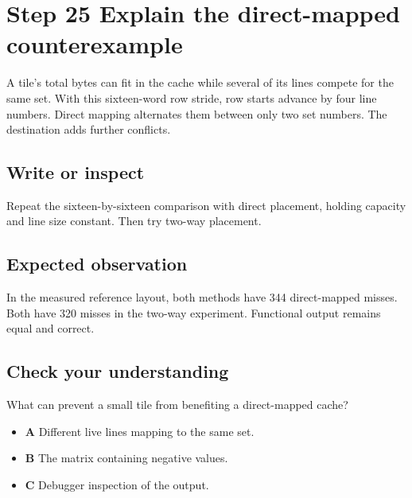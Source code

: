 \section{Step 25 Explain the direct-mapped counterexample}\label{transpose-s25}

A tile’s total bytes can fit in the cache while several of its lines compete for the same set. With this sixteen-word row stride, row starts advance by four line numbers. Direct mapping alternates them between only two set numbers. The destination adds further conflicts.

\subsection{Write or inspect}
Repeat the sixteen-by-sixteen comparison with direct placement, holding capacity and line size constant. Then try two-way placement.

\subsection{Expected observation}
In the measured reference layout, both methods have 344 direct-mapped misses. Both have 320 misses in the two-way experiment. Functional output remains equal and correct.

\subsection{Check your understanding}
What can prevent a small tile from benefiting a direct-mapped cache?

\begin{itemize}
  \item \textbf{A} Different live lines mapping to the same set.
  \item \textbf{B} The matrix containing negative values.
  \item \textbf{C} Debugger inspection of the output.
\end{itemize}
